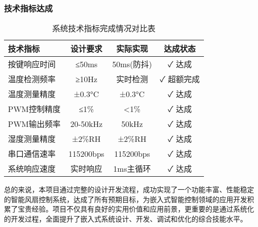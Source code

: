 \subsubsection{技术指标达成}

\begin{table}[H]
  \centering
  \caption{系统技术指标完成情况对比表}
  \label{tab:technical_achievements}
  \begin{tabular}{|l|c|c|c|}
    \hline
    \textbf{技术指标} & \textbf{设计要求} & \textbf{实际实现} & \textbf{达成状态} \\
    \hline
    按键响应时间 & ≤50ms & 50ms(防抖) & ✓ 达成 \\
    \hline
    温度检测频率 & ≥10Hz & 实时检测 & ✓ 超额完成 \\
    \hline
    温度测量精度 & ±0.3°C & ±0.3°C & ✓ 达成 \\
    \hline
    PWM控制精度 & ≤1\% & <1\% & ✓ 达成 \\
    \hline
    PWM输出频率 & 20-50kHz & 50kHz & ✓ 达成 \\
    \hline
    湿度测量精度 & ±2\%RH & ±2\%RH & ✓ 达成 \\
    \hline
    串口通信速率 & 115200bps & 115200bps & ✓ 达成 \\
    \hline
    系统响应速度 & 实时响应 & 1ms主循环 & ✓ 达成 \\
    \hline
  \end{tabular}
\end{table}

\qquad 总的来说，本项目通过完整的设计开发流程，成功实现了一个功能丰富、性能稳定的智能风扇控制系统，达成了所有预期目标，为嵌入式智能控制领域的应用开发积累了宝贵经验。项目不仅具有良好的实用价值和应用前景，更重要的是通过系统化的开发过程，全面提升了嵌入式系统设计、开发、调试和优化的综合技能水平。